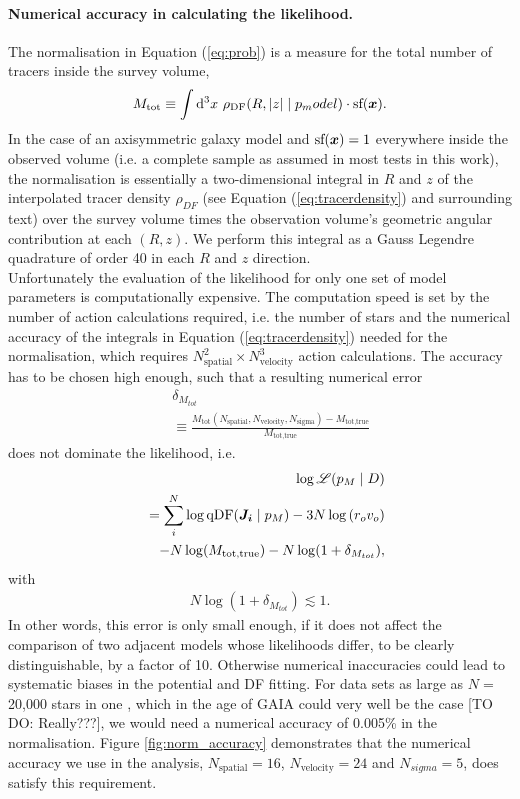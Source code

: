 \paragraph{Numerical accuracy in calculating the likelihood.} The normalisation in Equation (\ref{eq:prob}) is a measure for the total number of tracers inside the survey volume,
\begin{equation}
M_\text{tot} \equiv \int \mathop{}\!\mathrm{d^3} x \  \rho_\text{DF}(R,|z| \mid p_model) \cdot \text{sf}(\boldsymbol{x}).\label{eq:normalisation}
\end{equation}
In the case of an axisymmetric galaxy model and $\text{sf}(\boldsymbol{x})=1$ everywhere inside the observed volume (i.e. a complete sample as assumed in most tests in this work), the normalisation is essentially a two-dimensional integral in $R$ and $z$ of the interpolated tracer density $\rho_{DF}$ (see Equation (\ref{eq:tracerdensity}) and surrounding text) over the survey volume times the observation volume's geometric angular contribution at each $(R,z)$. We perform this integral as a Gauss Legendre quadrature of order 40 in each $R$ and $z$ direction.
\\Unfortunately the evaluation of the likelihood for only one set of model parameters is computationally expensive. The computation speed is set by the number of action calculations required, i.e. the number of stars and the numerical accuracy of the integrals in Equation (\ref{eq:tracerdensity}) needed for the normalisation, which requires $N_\text{spatial}^2 \times N_\text{velocity}^3$ action calculations. The accuracy has to be chosen high enough, such that a resulting numerical error 
\begin{eqnarray}
&&\delta_{M_{tot}} \nonumber\\
&&\equiv \frac{M_\text{tot}(N_\text{spatial},N_\text{velocity},N_\text{sigma}) -  M_\text{tot,true} }{M_\text{tot,true}}\label{eq:relerrlikelihood}
\end{eqnarray}
does not dominate the likelihood, i.e.
\begin{eqnarray}
& &\log \mathscr{L}(p_M \mid D) \nonumber\\
&& = \sum_i^{N} \log \text{qDF}(\boldsymbol{J_i} \mid p_M) - 3N \log \left( r_o v_o\right)\nonumber\\
& & -N \log(M_\text{tot,true}) - N \log (1 + \delta_{M_{tot}}),\label{eq:loglikelihood_relerr}
\end{eqnarray}
with
\begin{eqnarray}
N \log (1 + \delta_{M_{tot}}) \lesssim 1.\nonumber
\end{eqnarray}
In other words, this error is only small enough, if it does not affect the comparison of two adjacent models whose likelihoods differ, to be clearly distinguishable, by a factor of 10. Otherwise numerical inaccuracies could lead to systematic biases in the potential and DF fitting. For data sets as large as $N =$ 20,000 stars in one \MAP, which in the age of GAIA could very well be the case [TO DO: Really???], we would need a numerical accuracy of 0.005\% in the normalisation. Figure \ref{fig:norm_accuracy} demonstrates that the numerical accuracy we use in the analysis, $N_\text{spatial}=16$, $N_\text{velocity}=24$ and $N_{sigma}=5$, does satisfy this requirement.

